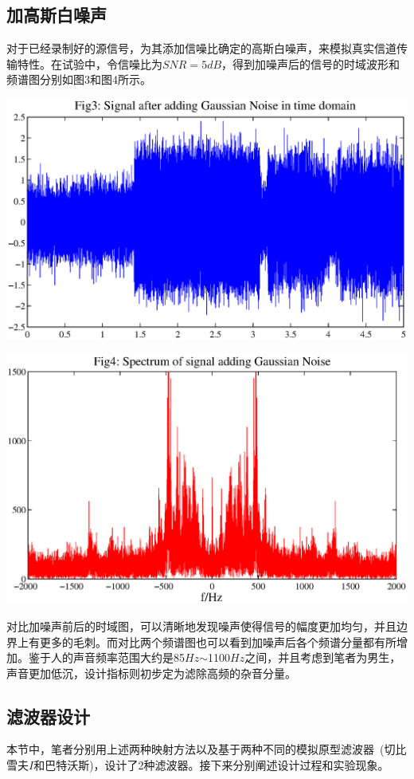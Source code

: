 \documentclass[a4paper,11pt,onecolumn,twoside]{article}
\begin{document}
\subsection{加高斯白噪声}
对于已经录制好的源信号，为其添加信噪比确定的高斯白噪声，来模拟真实信道传输特性。在试验中，令信噪比为$SNR = 5dB$，得到加噪声后的信号的时域波形和频谱图分别如图3和图4所示。
\begin{center}
    \includegraphics[width=1\textwidth]{fig3.eps}
\end{center}
\begin{center}
    \includegraphics[width=1\textwidth]{fig4.eps}
\end{center}

对比加噪声前后的时域图，可以清晰地发现噪声使得信号的幅度更加均匀，并且边界上有更多的毛刺。而对比两个频谱图也可以看到加噪声后各个频谱分量都有所增加。鉴于人的声音频率范围大约是85$Hz$$\sim$1100$Hz$之间，并且考虑到笔者为男生，声音更加低沉，设计指标则初步定为滤除高频的杂音分量。

\subsection{滤波器设计}
本节中，笔者分别用上述两种映射方法以及基于两种不同的模拟原型滤波器~(切比雪夫$I$和巴特沃斯)，设计了2种滤波器。接下来分别阐述设计过程和实验现象。
\end{document}
